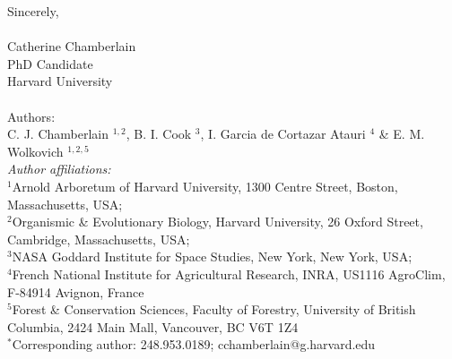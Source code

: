 \documentclass[11pt,a4paper]{article}\usepackage[]{graphicx}\usepackage[]{color}
\begin{document}
\vspace{1.5ex}
\noindent Sincerely, \\
\vspace{1.5ex}\\
\noindent Catherine Chamberlain\\
\noindent PhD Candidate\\
\noindent Harvard University\\
\vspace{1.5ex}\\
\noindent Authors:\\
C. J. Chamberlain $^{1,2}$, B. I. Cook $^{3}$, I. Garcia de Cortazar Atauri $^{4}$ \& E. M. Wolkovich $^{1,2,5}$
\vspace{2ex}\\
\emph{Author affiliations:}\\
$^{1}$Arnold Arboretum of Harvard University, 1300 Centre Street, Boston, Massachusetts, USA; \\
$^{2}$Organismic \& Evolutionary Biology, Harvard University, 26 Oxford Street, Cambridge, Massachusetts, USA; \\
$^{3}$NASA Goddard Institute for Space Studies, New York, New York, USA; \\
$^{4}$French National Institute for Agricultural Research, INRA, US1116 AgroClim, F-84914 Avignon, France\\
$^{5}$Forest \& Conservation Sciences, Faculty of Forestry, University of British Columbia, 2424 Main Mall, Vancouver, BC V6T 1Z4\\
\vspace{2ex}
$^*$Corresponding author: 248.953.0189; cchamberlain@g.harvard.edu\\


\newpage
\nocite{Vitasse2014}
\nocite{Vitasse2014a}
\nocite{Xie2015}
\nocite{Zohner2016}
\nocite{Lenz2016}
\nocite{Hofmann2015}
\nocite{Kollas2014}
\nocite{Dolezal2016}
\nocite{Xin2016}
\nocite{Lenz2013}
\nocite{Muffler2016}

\end{document}
